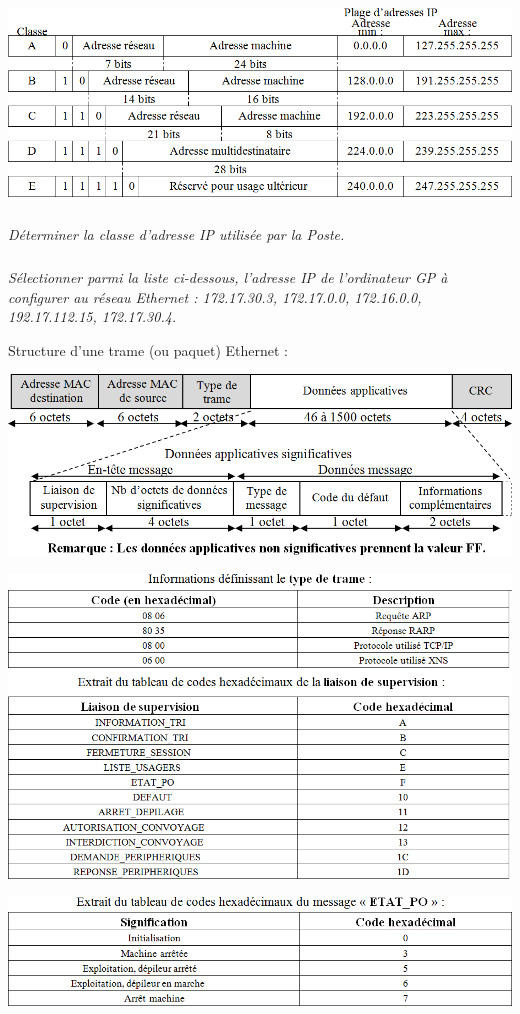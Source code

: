 \documentclass[10pt]{article}
\begin{document}
\begin{center}
\includegraphics[width=.8\textwidth]{images/im_03}
\end{center}

\subparagraph{}
\textit{Déterminer la classe d’adresse IP utilisée par la Poste.}


\subparagraph{}
\textit{Sélectionner parmi la liste ci-dessous, l’adresse IP de l’ordinateur GP à configurer au réseau Ethernet : 172.17.30.3, 172.17.0.0, 172.16.0.0, 192.17.112.15, 172.17.30.4.}

Structure d’une trame (ou paquet) Ethernet :

\begin{center}
\includegraphics[width=.8\textwidth]{images/im_04}
\end{center}

\begin{center}
\includegraphics[width=.8\textwidth]{images/im_05}
\end{center}

\begin{center}
\includegraphics[width=.8\textwidth]{images/im_06}
\end{center}
\end{document}
